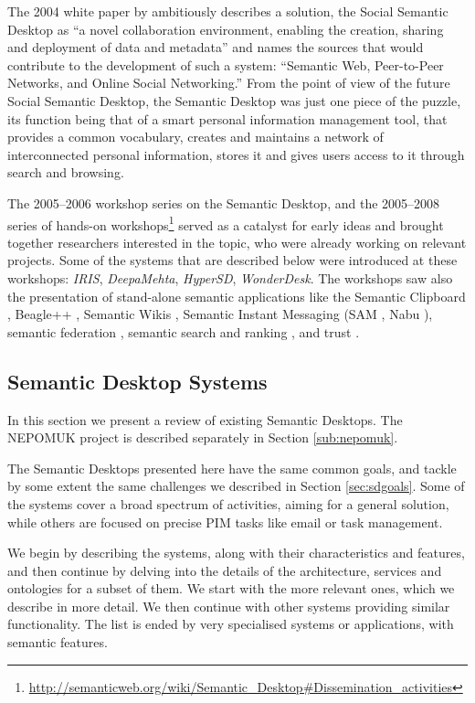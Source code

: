 The 2004 white paper by \cite{Decker2004} ambitiously describes a solution, the Social Semantic Desktop as ``a novel collaboration environment, enabling the creation, sharing and deployment of data and metadata'' and names the sources that would contribute to the development of such a system: ``Semantic Web, Peer-to-Peer Networks, and Online Social Networking.'' From the point of view of the future Social Semantic Desktop, the Semantic Desktop was just one piece of the puzzle, its function being that of a smart personal information management tool, that provides a common vocabulary, creates and maintains a network of interconnected personal information, stores it and gives users access to it through search and browsing.

The 2005--2006 workshop series on the Semantic Desktop, and the 2005--2008 series of hands-on workshops\footnote{\url{http://semanticweb.org/wiki/Semantic\_Desktop\#Dissemination\_activities}} served as a catalyst for early ideas and brought together researchers interested in the topic, who were already working on relevant projects. Some of the systems that are described below were introduced at these workshops: \emph{IRIS}, \emph{DeepaMehta}, \emph{HyperSD}, \emph{WonderDesk}. The workshops saw also the presentation of stand-alone semantic applications like the Semantic Clipboard \cite{Reif2006}, Beagle++ \cite{Brunkhorst2006}, Semantic Wikis \cite{Oren2005,Aumueller2005}, Semantic Instant Messaging (SAM \cite{Franz2005}, Nabu \cite{Osterfeld2005}), semantic federation \cite{Park2006}, semantic search and ranking \cite{Chirita2005}, and trust \cite{Noh2006}.

\subsection{Semantic Desktop Systems}
\label{sec:sdsystems}

In this section we present a review of existing Semantic Desktops. The NEPOMUK project is described separately in Section \ref{sub:nepomuk}. 

The Semantic Desktops presented here have the same common goals, and tackle by some extent the same challenges we described in Section \ref{sec:sdgoals}. Some of the systems cover a broad spectrum of activities, aiming for a general solution, while others are focused on precise PIM tasks like email or task management. 

We begin by describing the systems, along with their characteristics and features, and then continue by delving into the details of the architecture, services and ontologies for a subset of them. We start with the more relevant ones, which we describe in more detail. We then continue with other systems providing similar functionality. The list is ended by very specialised systems or applications, with semantic features.


